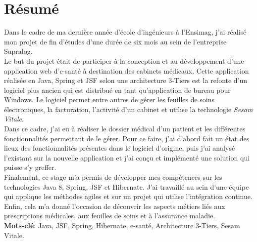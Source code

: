 \newpage
\section*{Résumé}  

Dans le cadre de ma dernière année d'école d'ingénieurs à l’Ensimag, j’ai réalisé mon projet de fin d’études d’une durée de six mois au sein de l’entreprise Supralog.\\

Le but du projet était de participer à la conception et au développement d’une application web d’e-santé à destination des cabinets médicaux. Cette application réalisée en Java, Spring et JSF selon une architecture 3-Tiers est la refonte d'un logiciel plus ancien qui est distribué en tant qu'application de bureau pour Windows. Le logiciel permet entre autres de gérer les feuilles de soins électroniques, la facturation, l'activité d'un cabinet et utilise la technologie \textit{\gls{Sesam Vitale}}.\\

Dans ce cadre, j’ai eu à réaliser le dossier médical d'un patient et les différentes fonctionnalités permettant de le gérer. Pour ce faire, j'ai d'abord fait un état des lieux des fonctionnalités présentes dans le logiciel d'origine, puis j'ai analysé l'existant sur la nouvelle application et j'ai conçu et implémenté une solution qui puisse s'y greffer.\\

Finalement, ce stage m'a permis de développer mes compétences sur les technologies Java 8, Spring, JSF et Hibernate. J'ai  travaillé au sein d'une équipe qui applique les méthodes agiles et sur un projet qui utilise l'intégration continue. Enfin, cela m'a donné l'occasion de découvrir les aspects métiers liés aux prescriptions médicales, aux feuilles de soins et à l'assurance maladie.\\

\textbf{Mots-clé}: Java, JSF, Spring, Hibernate, e-santé, Architecture 3-Tiers, Sesam Vitale.